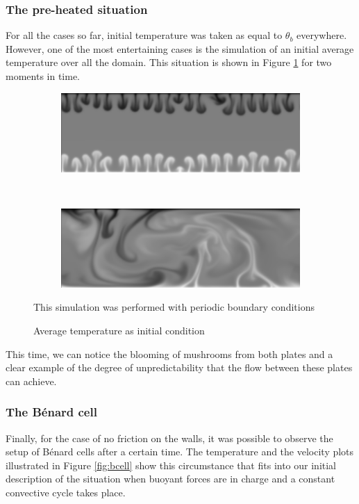 \documentclass[12pt,oneside]{article}
\begin{document}
\subsubsection{The pre-heated situation}
For all the cases so far, initial temperature was taken as equal to $\theta_b$ everywhere. However, one of the most entertaining cases is the simulation of an initial average temperature over all the domain. This situation is shown in Figure \ref{fig:ave} for two moments in time.

\begin{figure}[ht]
  \centering
  \begin{subfigure}[b]{0.95\textwidth}
    \includegraphics[width=\textwidth]{av1.png}
  \end{subfigure}
  \\[5pt]
  \begin{subfigure}[b]{0.95\textwidth}
    \includegraphics[width=\textwidth]{av2.png}
  \end{subfigure}
  \caption{Average temperature as initial condition}\label{fig:ave}
  \footnotesize{This simulation was performed with periodic boundary conditions}
\end{figure}

This time, we can notice the blooming of mushrooms from both plates and a clear example of the degree of unpredictability that the flow between these plates can achieve.

\subsubsection{The Bénard cell}
Finally, for the case of no friction on the walls, it was possible to observe the setup of Bénard cells after a certain time. The temperature and the velocity plots illustrated in Figure \ref{fig:bcell} show this circumstance that fits into our initial description of the situation when buoyant forces are in charge and a constant convective cycle takes place.
\end{document}
